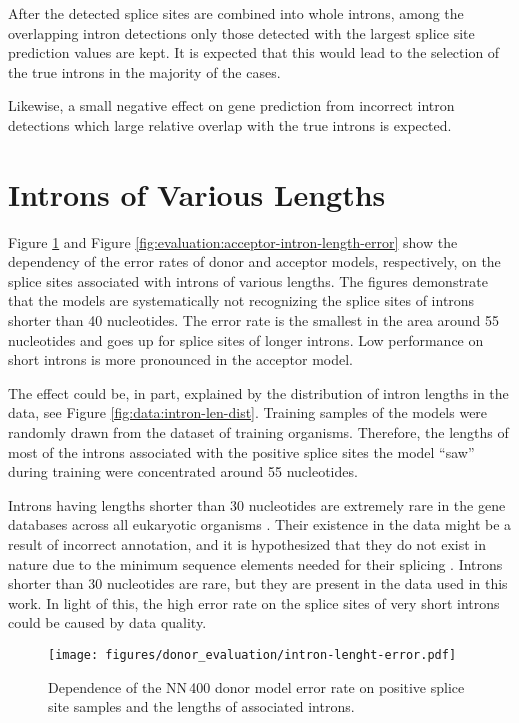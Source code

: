 After the detected splice sites are combined into whole introns, among the
overlapping intron detections only those detected with the largest splice site
prediction values are kept. It is expected that this would lead to the
selection of the true introns in the majority of the cases.

Likewise, a small negative effect on gene prediction from incorrect intron
detections which large relative overlap with the true introns is expected.

\section{\label{ch:evaluation:lengths}Introns of Various Lengths}

Figure \ref{fig:evaluation:donor-intron-length-error} and Figure
\ref{fig:evaluation:acceptor-intron-length-error} show the dependency of the
error rates of donor and acceptor models, respectively, on the splice sites
associated with introns of various lengths. The figures demonstrate that the
models are systematically not recognizing the splice sites of introns shorter
than 40 nucleotides. The error rate is the smallest in the area around 55
nucleotides and goes up for splice sites of longer introns. Low performance on
short introns is more pronounced in the acceptor model.

The effect could be, in part, explained by the distribution of intron lengths
in the data, see Figure \ref{fig:data:intron-len-dist}. Training samples of the
models were randomly drawn from the dataset of training organisms. Therefore,
the lengths of most of the introns associated with the positive splice sites
the model ``saw'' during training were concentrated around 55 nucleotides.

Introns having lengths shorter than 30 nucleotides are extremely rare in the
gene databases across all eukaryotic organisms
\cite{piovesan2015identification}. Their existence in the data might be a
result of incorrect annotation, and it is hypothesized that they do not exist
in nature due to the minimum sequence elements needed for their splicing
\cite{piovesan2015identification}. Introns shorter than 30 nucleotides are
rare, but they are present in the data used in this work. In light of this, the
high error rate on the splice sites of very short introns could be caused by
data quality.

\begin{figure}
  \centering
  \texttt{[image: figures/donor\_evaluation/intron-lenght-error.pdf]}
  \caption{Dependence of the NN\,400 donor model error rate on positive splice
    site samples and the lengths of associated introns.}
  \label{fig:evaluation:donor-intron-length-error}
\end{figure}

